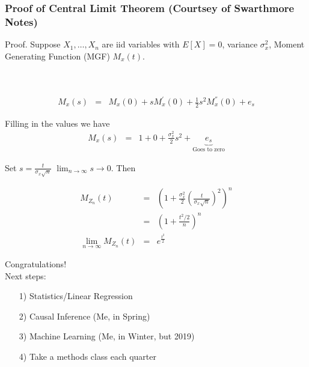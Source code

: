 \documentclass{beamer}
\numberwithin{equation}{section}
\begin{document}
\begin{frame}
\frametitle{Proof of Central Limit Theorem (Courtsey of Swarthmore Notes)}

\large{Proof.}
Suppose $X_{1}, \hdots, X_{n}$ are iid variables with $E[X] = 0 $, variance $\sigma^{2}_{x}$, Moment Generating Function (MGF) $M_{x}(t)$. \pause  \\

 \pause \\
 \pause \\

\end{frame}


\begin{frame}
\begin{eqnarray}
M_{x} (s) & = & M_{x} (0)  + s M^{'}_{x}(0) + \frac{1}{2} s^2 M_{x}^{''}(0) + e_{s} \nonumber 
\end{eqnarray}

Filling  in the values we have 
\begin{eqnarray}
M_{x} (s) & = & 1  + 0 + \frac{\sigma_{x}^{2}}{2} s^2  + \underbrace{e_{s}}_{\text{Goes to zero}} \nonumber 
\end{eqnarray}

Set $s = \frac{t}{\sigma_{x} \sqrt{n}} $ $\lim_{n\rightarrow \infty} s \rightarrow 0$.  Then 

\begin{eqnarray}
M_{Z_{n}}(t) & = & \left(1 + \frac{\sigma_{x}^{2}}{2}\left( \frac{t}{\sigma_{x} \sqrt{n}} \right)^{2} \right)^{n} \nonumber \\
& = & \left( 1 + \frac{t^{2}/2}{n} \right)^{n} \nonumber \\
\lim_{n\rightarrow \infty} M_{Z_{n}}(t) & = & e^{\frac{t^2}{2}}\nonumber 
\end{eqnarray}

\end{frame}


\begin{frame}

Congratulations! \\
Next steps:\\
\begin{itemize}
\item[1)] Statistics/Linear Regression
\item[2)] Causal Inference (Me, in Spring)
\item[3)] Machine Learning (Me, in Winter, but 2019)
\item[4)] Take a methods class each quarter
\end{itemize}




\end{frame}
\end{document}
